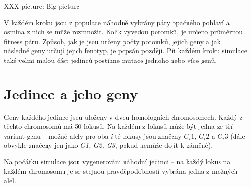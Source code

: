 XXX picture: Big picture

V každém kroku jsou z populace náhodně vybrány páry opačného pohlaví a osmina z nich se může rozmnožit. Kolik vyvedou potomků, je určeno průměrnou fitness páru. Způsob, jak je jsou určeny počty potomků, jejich geny a jak následně geny určují jejich fenotyp, je popsán později.  Při každém kroku simulace také velmi malou část jedinců postihne mutace jednoho nebo více genů.

\section{Jedinec a jeho geny}

Geny každého jedince jsou uloženy v dvou homologních chromosomech. Každý z těchto chromosomů má 50 lokusů.  Na každém z lokusů může být jedna ze tří variant genu -- možné alely pro oba \textit{i}-té lokusy jsou značeny $G_i{}1$, $G_i{}2$ a $G_i{}3$ (dále obvykle značeny jen jako \textit{G1, G2, G3}, pokud nemůže dojít k záměně).


Na počátku simulace jsou vygenerováni náhodní jedinci -- na každý lokus na každém chromosomu je se stejnou pravděpodobností vybrána jedna z možných alel.

